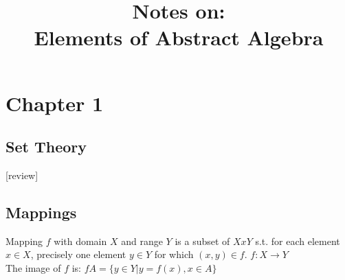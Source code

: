 \documentclass[12pt]{article}
\title{Notes on:\\Elements of Abstract Algebra}
\author{}
\date{} %
\begin{document}
\maketitle

\section{Chapter 1}

\subsection{Set Theory}
[review]

\subsection{Mappings}
Mapping $f$ with domain $X$ and range $Y$ is a subset of $X x Y$ s.t. for each element $x \in X$, precisely one element $y \in Y$ for which $(x, y) \in f$.
$f: X \to Y$\\
The image of $f$ is: $fA = \{ y \in Y | y = f(x), x \in A \}$
\end{document}
